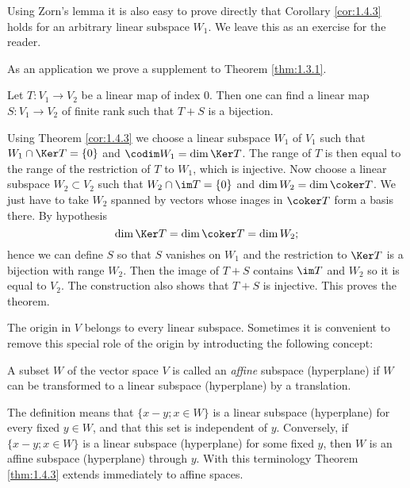 \begin{rem}
  Using Zorn's lemma it is also easy to prove directly that Corollary
  \ref{cor:1.4.3} holds for an arbitrary linear subspace $W_1$. We
  leave this as an exercise for the reader.
\end{rem}
As an application we prove a supplement to Theorem \ref{thm:1.3.1}.
\begin{thm}
  \label{thm:1.4.4}
  Let $T:V_1\to V_2$ be a linear map of index $0$. Then one can find a
  linear map $S:V_1\to V_2$ of finite rank such that $T+S$ is a bijection.
\end{thm}
\begin{prf}
  Using Theorem \ref{cor:1.4.3} we choose a linear subspace $W_1$ of
  $V_1$ such that $W_1\cap \Ker T=\{0\}$ and $\codim W_1=\dim\Ker
  T$. The range of $T$ is then equal to the range of the restriction
  of $T$ to $W_1$, which is injective. Now choose a linear subspace
  $W_2\subset V_2$ such that $W_2\cap\im T=\{0\}$ and $\dim
  W_2=\dim\coker T$. We just have to take $W_2$ spanned by vectors
  whose inages in $\coker T$ form a basis there. By hypothesis
  \begin{displaymath}
    \dim\Ker T=\dim\coker T=\dim W_2;
  \end{displaymath}
hence we can define $S$ so that $S$ vanishes on $W_1$ and the
restriction to $\Ker T$ is a bijection with range $W_2$. Then the
image of $T+S$ contains $\im T$ and $W_2$ so it is equal to $V_2$. The
construction also shows that $T+S$ is injective. This proves the theorem.
\end{prf}
The origin in $V$ belongs to every linear subspace. Sometimes it is
convenient to remove this special role of the origin by introducting
the following concept:
\begin{dfn}
  \label{def:1.4.5}
  A subset $W$ of the vector space $V$ is called an \emph{affine}
  subspace (hyperplane) if $W$ can be transformed to a linear subspace
  (hyperplane) by a translation.
\end{dfn}
The definition means that $\{x-y;x\in W\}$ is a linear subspace
(hyperplane) for every fixed $y\in W$, and that this set is
independent of $y$. Conversely, if $\{x-y;x\in W\}$ is a linear
subspace (hyperplane) for some fixed $y$, then $W$ is an affine
subspace (hyperplane) through $y$. With this terminology
Theorem \ref{thm:1.4.3} extends immediately to affine spaces.

